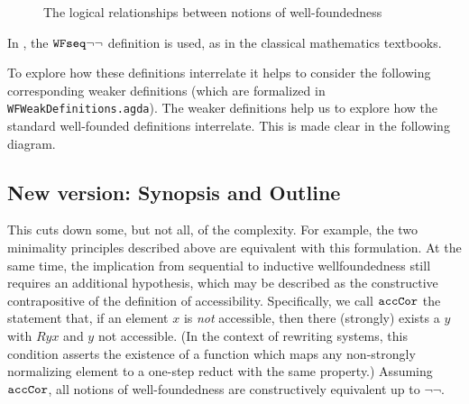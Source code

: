 \begin{figure}[ht]
\caption{The logical relationships between notions of well-foundedness}
 \label{fig:WF} 
\end{figure}
\clearpage

In \cite{Terese}, the $\mathtt{WFseq}{\lnot\lnot}$ definition is used, as in the classical mathematics textbooks. 


To explore how these definitions interrelate it helps to consider the following corresponding weaker definitions (which are formalized in \texttt{WFWeakDefinitions.agda}). 
The weaker definitions help us to explore how the standard well-founded definitions interrelate. This is made clear in the following diagram.

\subsection{New version: Synopsis and Outline} 
This cuts down some, but not all, of the complexity.
For example, the two minimality principles
described above are equivalent with this formulation.
At the same time, the
implication from sequential to inductive wellfoundedness
still requires an additional hypothesis, which may be described as the
constructive contrapositive of the definition of accessibility.
Specifically, we call {$\mathtt{accCor}$} the statement that, if an element $x$
is \emph{not} accessible, then there (strongly) exists a $y$ with $Ryx$
and $y$ not accessible.  (In the context of rewriting systems,
this condition asserts the existence of a function which maps any
non-strongly normalizing element to a one-step reduct with the same property.)
Assuming $\mathtt{accCor}$, all notions of well-foundedness
are constructively equivalent up to $\lnot\lnot$.

